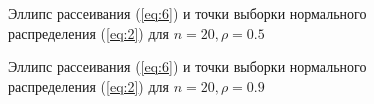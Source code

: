 \documentclass{article}
\begin{document}
\begin{figure}[h]
\caption{Эллипс рассеивания (\ref{eq:6}) и точки выборки нормального распределения (\ref{eq:2}) для $n = 20, \rho = 0.5$}
\end{figure}

\begin{figure}[h]
\caption{Эллипс рассеивания (\ref{eq:6}) и точки выборки нормального распределения (\ref{eq:2})  для $n = 20, \rho = 0.9$}
\end{figure}
\end{document}
